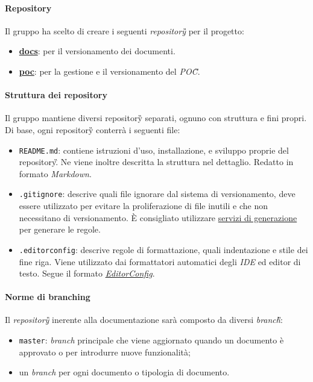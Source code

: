 		\paragraph*{Repository}
		\aCapo{}
			Il gruppo \teamname{} ha scelto di creare i seguenti \emph{repository\G{}} per il progetto:
			\begin{itemize}
				\item \href{https://github.com/Bug-s-Bunny-Team/docs}{\textbf{docs}}: per il versionamento dei documenti.
				\item \href{https://github.com/Bug-s-Bunny-Team/poc}{\textbf{poc}}: per la gestione e il versionamento del \textit{POC\G}.
			\end{itemize}

		\paragraph*{Struttura dei repository} %
		\aCapo{}  
		Il gruppo mantiene diversi repository\G{} separati, ognuno con struttura e fini propri.
		Di base, ogni repository\G{} conterrà i seguenti file:
		\begin{itemize}
			\item \verb#README.md#: contiene istruzioni d'uso, installazione, e sviluppo proprie del repository\G. Ne viene inoltre descritta la struttura nel dettaglio. Redatto in formato \textit{Markdown}.
			\item \verb#.gitignore#: descrive quali file ignorare dal sistema di versionamento, deve essere utilizzato per evitare la proliferazione di file inutili e che non necessitano di versionamento. È consigliato utilizzare \href{https://www.toptal.com/developers/gitignore}{servizi di generazione} per generare le regole.
			\item \verb#.editorconfig#: descrive regole di formattazione, quali indentazione e stile dei fine riga. Viene utilizzato dai formattatori automatici degli \textit{IDE} ed editor di testo. Segue il formato \href{https://editorconfig.org/}{\textit{EditorConfig}}.
		\end{itemize}

		\paragraph*{Norme di branching}
		\aCapo{}  
			Il \emph{repository\G{}} inerente alla documentazione sarà composto da diversi \textit{branch\G}:
			\begin{itemize}
				\item \verb#master#: \emph{branch} principale che viene aggiornato quando un documento è approvato o per introdurre nuove funzionalità; 
				\item un \textit{branch} per ogni documento o tipologia di documento.
			\end{itemize}
		
